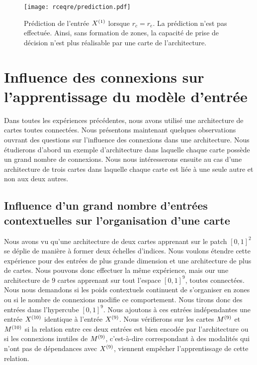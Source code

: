 \documentclass[../main]{subfiles}
\begin{document}
\begin{figure}
	\centering\texttt{[image: rceqre/prediction.pdf]}
	\caption{Prédiction de l'entrée $X^{({1})}$ lorsque $r_c = r_e$. La prédiction n'est pas effectuée. Ainsi, sans formation de zones, la capacité de prise de décision n'est plus réalisable par une carte de l'architecture. \label{fig:rcre_pred}}
\end{figure}


\section{Influence des connexions sur l'apprentissage du modèle d'entrée}

Dans toutes les expériences précédentes, nous avons utilisé une architecture de cartes toutes connectées. 
Nous présentons maintenant quelques observations ouvrant des questions sur l'influence des connexions dans une architecture.
Nous étudierons d'abord un exemple d'architecture dans laquelle chaque carte possède un grand nombre de connexions. 
Nous nous intéresserons ensuite au cas d'une architecture de trois cartes dans laquelle chaque carte est liée à une seule autre et non aux deux autres.

\subsection{Influence d'un grand nombre d'entrées contextuelles sur l'organisation d'une carte}

Nous avons vu qu'une architecture de deux cartes apprenant sur le patch $[0,1]^2$ se déplie de manière à former deux échelles d'indices. Nous voulons étendre cette expérience pour des entrées de plus grande dimension et une architecture de plus de cartes. Nous pouvons donc effectuer la même expérience, mais our une architecture de $9$ cartes apprenant sur tout l'espace $[0,1]^9$, toutes connectées.
Nous nous demandons si les poids contextuels continuent de s'organiser en zones ou si le nombre de connexions modifie ce comportement. Nous tirons donc des entrées dans l'hypercube $[0,1]^9$. 
Nous ajoutons à ces entrées indépendantes une entrée $X^{({10})}$ identique à l'entrée $X^{({9})}$. 
Nous vérifierons sur les cartes $M^{({9})}$ et $M^{({10})}$ si la relation entre ces deux entrées est bien encodée par l'architecture ou si les connexions \og inutiles \fg{} de $M^{({9})}$, c'est-à-dire correspondant à des modalités qui n'ont pas de dépendances avec $X^{({9})}$, viennent empêcher l'apprentissage de cette relation.
\end{document}

